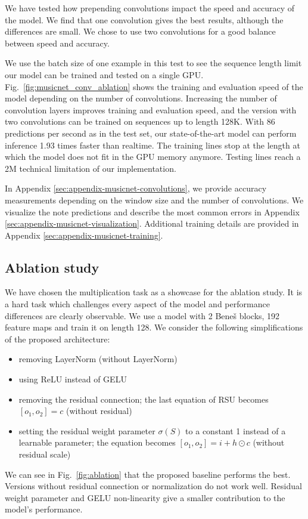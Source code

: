 \documentclass[letterpaper]{article} %
\begin{document}
We have tested how prepending convolutions impact the speed and accuracy of the model. We find that one convolution gives the best results, although the differences are small. We chose to use two convolutions for a good balance between speed and accuracy.

We use the batch size of one example in this test to see the sequence length limit our model can be trained and tested on a single GPU. Fig.~\ref{fig:musicnet_conv_ablation} shows the training and evaluation speed of the model depending on the number of convolutions. Increasing the number of convolution layers improves training and evaluation speed, and the version with two convolutions can be trained on sequences up to length 128K. With 86 predictions per second as in the test set, our state-of-the-art model can perform inference 1.93 times faster than realtime. The training lines stop at the length at which the model does not fit in the GPU memory anymore. Testing lines reach a 2M technical limitation of our implementation.

In Appendix \ref{sec:appendix-musicnet-convolutions}, we provide accuracy measurements depending on the window size and the number of convolutions. We visualize the note predictions and describe the most common errors in Appendix \ref{sec:appendix-musicnet-visualization}. Additional training details are provided in Appendix \ref{sec:appendix-musicnet-training}.

\subsection{Ablation study}
\label{sec:ablation}

We have chosen the multiplication task as a showcase for the ablation study. It is a hard task which challenges every aspect of the model and performance differences are clearly observable. We use a model with 2 Bene\v{s} blocks, 192 feature maps and train it on length 128. We consider the following simplifications of the proposed architecture: 
\begin{itemize}
  \item removing LayerNorm (without LayerNorm)
  \item using ReLU instead of GELU
  \item removing the residual connection; the last equation of RSU becomes $[o_1, o_2] = c$ (without residual)
  \item setting the residual weight parameter $\sigma(S)$ to a constant 1 instead of a learnable parameter; the equation becomes $[o_1, o_2] = i +  h\odot c$ (without residual scale)
\end{itemize}
 We can see in Fig.~\ref{fig:ablation} that the proposed baseline performs the best. Versions without residual connection or normalization do not work well. Residual weight parameter and GELU non-linearity give a smaller contribution to the model's performance. 
\end{document}
